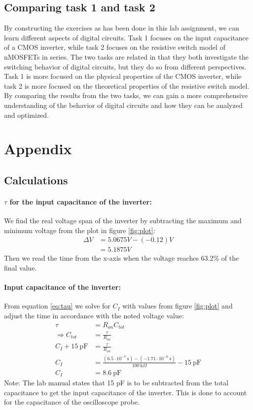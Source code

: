 \documentclass[onecolumn]{article}
\begin{document}
\subsection{Comparing task 1 and task 2}
By constructing the exercises as has been done in this lab assignment, we can learn different aspects of digital circuits. Task 1 focuses on the input capacitance of a CMOS inverter, while task 2 focuses on the resistive switch model of nMOSFETs in series. The two tasks are related in that they both investigate the switching behavior of digital circuits, but they do so from different perspectives. Task 1 is more focused on the physical properties of the CMOS inverter, while task 2 is more focused on the theoretical properties of the resistive switch model. By comparing the results from the two tasks, we can gain a more comprehensive understanding of the behavior of digital circuits and how they can be analyzed and optimized.

\section{Appendix}
\subsection{Calculations}
\paragraph{$\tau$ for the input capacitance of the inverter:}
We find the real voltage span of the inverter by subtracting the maximum and minimum voltage from the plot in figure \ref{fig:plot}:
\begin{align}
  \Delta V &= 5.0675 V - (-0.12) V \nonumber \\
  &= 5.1875 V \nonumber
\end{align}
Then we read the time from the x-axis when the voltage reaches 63.2\% of the final value.


\paragraph{Input capacitance of the inverter:}
From equation \ref{eq:tau} we solve for $C_{I}$ with values from figure \ref{fig:plot} and adjust the time in accordance with the noted voltage value:
\begin{align}
    \tau &= R_{on}C_{tot} \nonumber \\
    \Rightarrow C_{tot} &= \frac{\tau}{R_{on}} \nonumber \\
    C_{I} + 15 \ \text{pF} &= \frac{\tau}{R_{on}} \nonumber \\
    C_{I} &= \frac{(6.5 \cdot 10^{-7} \ \text{s}) - (-1.71 \cdot 10^{-6} \ \text{s})}{100 \ \text{k}\Omega} - 15 \ \text{pF}\nonumber \\
    C_{I} &= 8.6 \ \text{pF} \nonumber
\end{align}
Note: The lab manual states that 15 pF is to be subtracted from the total capacitance to get the input capacitance of the inverter. This is done to account for the capacitance of the oscilloscope probe.
\end{document}
